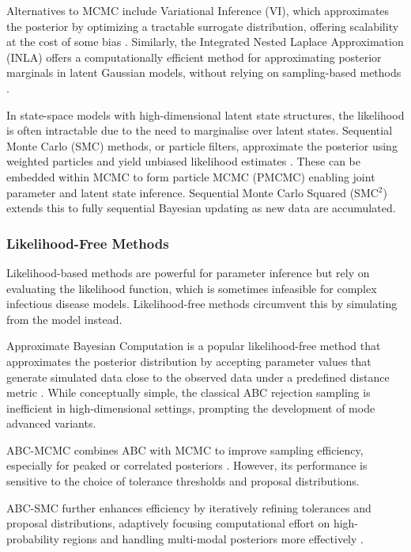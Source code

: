\documentclass{article}
\begin{document}
Alternatives to MCMC include Variational Inference (VI), which approximates the posterior by optimizing a tractable surrogate distribution, offering scalability at the cost of some bias \citep{blei2017variational, chatzilena2019contemporary}. Similarly, the Integrated Nested Laplace Approximation (INLA) 
offers a computationally efficient method for approximating posterior marginals in latent Gaussian models, without relying on sampling-based methods \citep{rue2017bayesian}.

In state-space models with high-dimensional latent state structures, the likelihood is often intractable due to the need to marginalise over latent states. Sequential Monte Carlo (SMC) methods, or particle filters, approximate the posterior using weighted particles and yield unbiased likelihood estimates \citep{doucet2001introduction}. These can be embedded within MCMC to form particle MCMC (PMCMC) \citep{andrieu2010particle, endo2019introduction} enabling joint parameter and latent state inference. Sequential Monte Carlo Squared (SMC$^2$) \citep{chopin2013smc2} extends this to fully sequential Bayesian updating as new data are accumulated.

\subsubsection{Likelihood-Free Methods}

Likelihood-based methods are powerful for parameter inference but rely on evaluating the likelihood function, which is sometimes infeasible for complex infectious disease models. Likelihood-free methods circumvent this by simulating from the model instead.

Approximate Bayesian Computation is a popular likelihood-free method that approximates the posterior distribution by accepting parameter values that generate simulated data close to the observed data under a predefined distance metric \citep{rubin1984bayesianly, tavare1997inferring, beaumont2002approximate}. While conceptually simple, the classical ABC rejection sampling is inefficient in high-dimensional settings, prompting the development of mode advanced variants. 

ABC-MCMC combines ABC with MCMC to improve sampling efficiency, especially for peaked or correlated posteriors \citep{marjoram2003markov, wegmann2009efficient, kypraios2017tutorial}. However, its performance is sensitive to the choice of tolerance thresholds and proposal distributions.

ABC-SMC further enhances efficiency by iteratively refining  tolerances and proposal distributions, adaptively focusing computational effort on high-probability regions and handling multi-modal posteriors more effectively \citep{sisson2007sequential, toni2009approximate, beaumont2009adaptive, drovandi2011likelihood}. 
\end{document}
